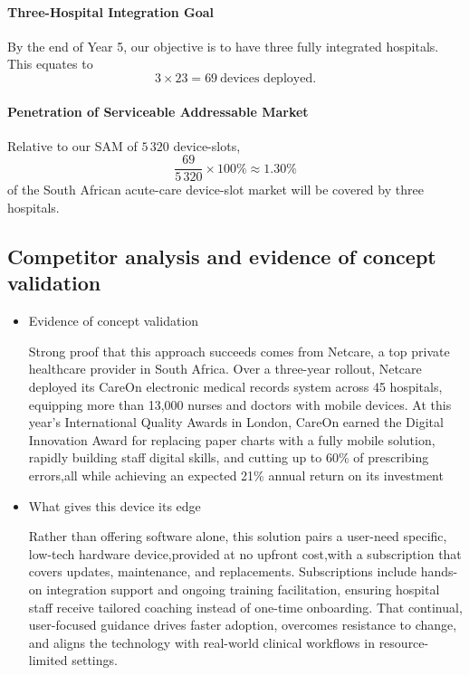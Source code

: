\documentclass[a4paper,11pt]{article}
\begin{document}
\paragraph{Three-Hospital Integration Goal}%
By the end of Year 5, our objective is to have three fully integrated hospitals.  This equates to
\[
  3 \times 23 = 69\ \text{devices deployed}.
\]

\paragraph{Penetration of Serviceable Addressable Market}%
Relative to our SAM of \(5\,320\) device-slots,
\[
  \frac{69}{5\,320}\times100\%
  \approx1.30\%
\]
of the South African acute-care device-slot market will be covered by three hospitals.  



\subsection{Competitor analysis and evidence of concept validation}
\begin{itemize} 

  \item Evidence of concept validation

Strong proof that this approach succeeds comes from Netcare, a top private healthcare provider in South Africa. Over a three-year rollout, Netcare deployed its CareOn electronic medical records system across 45 hospitals, equipping more than 13,000 nurses and doctors with mobile devices. At this year’s International Quality Awards in London, CareOn earned the Digital Innovation Award for replacing paper charts with a fully mobile solution, rapidly building staff digital skills, and cutting up to 60\% of prescribing errors,all while achieving an expected 21\% annual return on its investment\cite{News}

 \item What gives this device its edge

Rather than offering software alone, this solution pairs a user-need specific, low-tech hardware device,provided at no upfront cost,with a subscription that covers updates, maintenance, and replacements. Subscriptions include hands-on integration support and ongoing training facilitation, ensuring hospital staff receive tailored coaching instead of one-time onboarding. That continual, user-focused guidance drives faster adoption, overcomes resistance to change, and aligns the technology with real-world clinical workflows in resource-limited settings.

\end{itemize}
\end{document}
